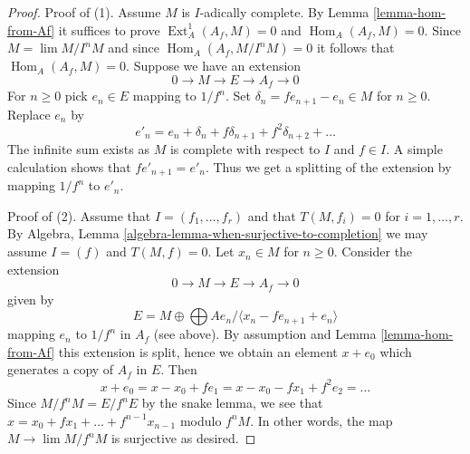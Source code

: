 \documentclass[10pt,a4paper]{amsart}
\theoremstyle{plain}
\theoremstyle{definition}
\theoremstyle{remark}
\numberwithin{equation}{subsection}
\def\lim{\mathop{\mathrm{lim}}\nolimits}
\def\Hom{\mathop{\mathrm{Hom}}\nolimits}
\def\Ext{\mathop{\mathrm{Ext}}\nolimits}
\begin{document}
\begin{proof}
Proof of (1). Assume $M$ is $I$-adically complete.
By Lemma \ref{lemma-hom-from-Af} it suffices to prove
$\Ext^1_A(A_f, M) = 0$ and $\Hom_A(A_f, M) = 0$.
Since $M = \lim M/I^nM$ and since $\Hom_A(A_f, M/I^nM) = 0$
it follows that $\Hom_A(A_f, M) = 0$. Suppose we have an extension
$$
0 \to M \to E \to A_f \to 0
$$
For $n \geq 0$ pick $e_n \in E$ mapping to $1/f^n$.
Set $\delta_n = fe_{n + 1} - e_n \in M$ for $n \geq 0$.
Replace $e_n$ by
$$
e'_n = e_n + \delta_n + f\delta_{n + 1} + f^2 \delta_{n + 2} + \ldots
$$
The infinite sum exists as $M$ is complete with respect to $I$ and $f \in I$.
A simple calculation shows that $fe'_{n + 1} = e'_n$. Thus we get a splitting
of the extension by mapping $1/f^n$ to $e'_n$.

\medskip\noindent
Proof of (2). Assume that $I = (f_1, \ldots, f_r)$ and that $T(M, f_i) = 0$
for $i = 1, \ldots, r$. By
Algebra, Lemma \ref{algebra-lemma-when-surjective-to-completion}
we may assume $I = (f)$ and $T(M, f) = 0$. Let $x_n \in M$ for $n \geq 0$.
Consider the extension
$$
0 \to M \to E \to A_f \to 0
$$
given by
$$
E = M \oplus \bigoplus Ae_n\Big/\langle x_n - fe_{n + 1} + e_n\rangle
$$
mapping $e_n$ to $1/f^n$ in $A_f$ (see above).
By assumption and Lemma \ref{lemma-hom-from-Af}
this extension is split, hence we obtain an element
$x + e_0$ which generates a copy of $A_f$ in $E$.
Then
$$
x + e_0 = x - x_0 + fe_1 = x - x_0 - f x_1 + f^2 e_2 = \ldots
$$
Since $M/f^nM = E/f^nE$ by the snake lemma, we see that
$x = x_0 + fx_1 + \ldots + f^{n - 1}x_{n - 1}$ modulo $f^nM$.
In other words, the map $M \to \lim M/f^nM$ is surjective as desired.
\end{proof}
\end{document}
